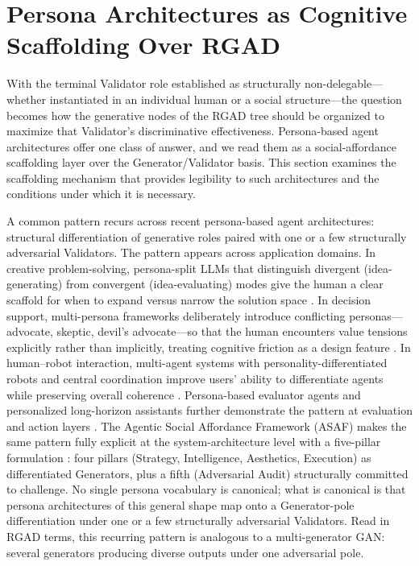 \documentclass[11pt,a4paper]{article}
\begin{document}
\section{Persona Architectures as Cognitive Scaffolding Over RGAD}
With the terminal Validator role established as structurally non-delegable---whether instantiated in an individual human or a social structure---the question becomes how the generative nodes of the RGAD tree should be organized to maximize that Validator's discriminative effectiveness. Persona-based agent architectures offer one class of answer, and we read them as a social-affordance scaffolding layer over the Generator/Validator basis. This section examines the scaffolding mechanism that provides legibility to such architectures and the conditions under which it is necessary.

A common pattern recurs across recent persona-based agent architectures: structural differentiation of generative roles paired with one or a few structurally adversarial Validators. The pattern appears across application domains. In creative problem-solving, persona-split LLMs that distinguish divergent (idea-generating) from convergent (idea-evaluating) modes give the human a clear scaffold for when to expand versus narrow the solution space \citep{epperson2025}. In decision support, multi-persona frameworks deliberately introduce conflicting personas---advocate, skeptic, devil's advocate---so that the human encounters value tensions explicitly rather than implicitly, treating cognitive friction as a design feature \citep{kumar2025}. In human--robot interaction, multi-agent systems with personality-differentiated robots and central coordination improve users' ability to differentiate agents while preserving overall coherence \citep{alami2026}. Persona-based evaluator agents and personalized long-horizon assistants further demonstrate the pattern at evaluation and action layers \citep{li2025, zhang2025}. The Agentic Social Affordance Framework (ASAF) makes the same pattern fully explicit at the system-architecture level with a five-pillar formulation \citep{lee2026}: four pillars (Strategy, Intelligence, Aesthetics, Execution) as differentiated Generators, plus a fifth (Adversarial Audit) structurally committed to challenge. No single persona vocabulary is canonical; what is canonical is that persona architectures of this general shape map onto a Generator-pole differentiation under one or a few structurally adversarial Validators. Read in RGAD terms, this recurring pattern is analogous to a multi-generator GAN: several generators producing diverse outputs under one adversarial pole.
\end{document}
